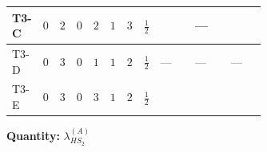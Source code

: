 \documentclass[8pt]{article}
\begin{document}
\begin{landscape}
\begin{longtable}{@{}llcccccc >{\raggedright\arraybackslash}p{0.21\linewidth} >{\raggedright\arraybackslash}p{0.21\linewidth} >{\raggedright\arraybackslash}p{0.21\linewidth}@{}}
\midrule
T3-C & $0$ & $2$ & $0$ & $2$ & $1$ & $3$ & $\frac{1}{2}$ & \scriptsize\adjustbox{max width=\linewidth}{$\begin{gathered} +{g_1}^2 \left(12 {g_2}^2-\frac{15 {\lambda_{HS_2}^{(A)}}}{2}\right)\end{gathered}$} & --- & \scriptsize\adjustbox{max width=\linewidth}{$\begin{gathered} +2 {\lambda_1} {\lambda_{HS_2}^{(A)}}\end{gathered}$} \\
\midrule
T3-D & $0$ & $3$ & $0$ & $1$ & $1$ & $2$ & $\frac{1}{2}$ & --- & --- & --- \\
\midrule
T3-E & $0$ & $3$ & $0$ & $3$ & $1$ & $2$ & $\frac{1}{2}$ & \scriptsize\adjustbox{max width=\linewidth}{$\begin{gathered} +{g_1}^2 \left(4 {g_2}^2-\frac{15 {\lambda_{HS_2}^{(A)}}}{2}\right)\end{gathered}$} & \scriptsize\adjustbox{max width=\linewidth}{$\begin{gathered} -\frac{33 {g_2}^2 {\lambda_{HS_2}^{(A)}}}{2}\end{gathered}$} & \scriptsize\adjustbox{max width=\linewidth}{$\begin{gathered} +2 {\lambda_1} {\lambda_{HS_2}^{(A)}}\end{gathered}$} \\
\midrule
\bottomrule
\end{longtable}
\clearpage
\noindent\textbf{Quantity: }$\lambda_{HS_2}^{(A)}$\par\smallskip

\end{landscape}
\end{document}

